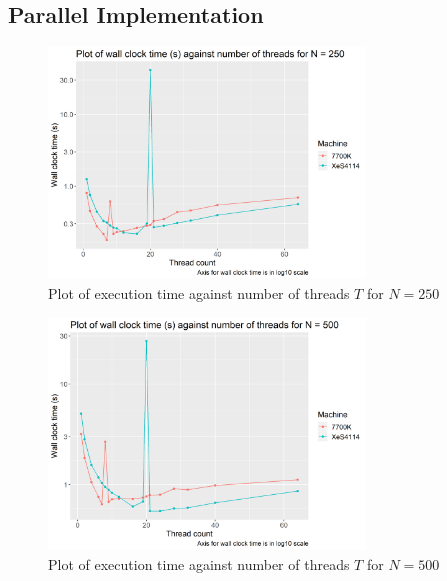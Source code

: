 \documentclass[12pt]{article}
\begin{document}
\pagebreak

\subsection{Parallel Implementation}

\begin{figure}[H]
    \centering
    \includegraphics[width=0.75\textwidth]{./processedResults/par-250N-varyThreads}
    \caption{Plot of execution time against number of threads $T$ for $N = 250$}
    \label{fig:par-250N-varyThreads}
\end{figure}

\begin{figure}[H]
    \centering
    \includegraphics[width=0.75\textwidth]{./processedResults/par-500N-varyThreads}
    \caption{Plot of execution time against number of threads $T$ for $N = 500$}
    \label{fig:par-500N-varyThreads}
\end{figure}
\end{document}
